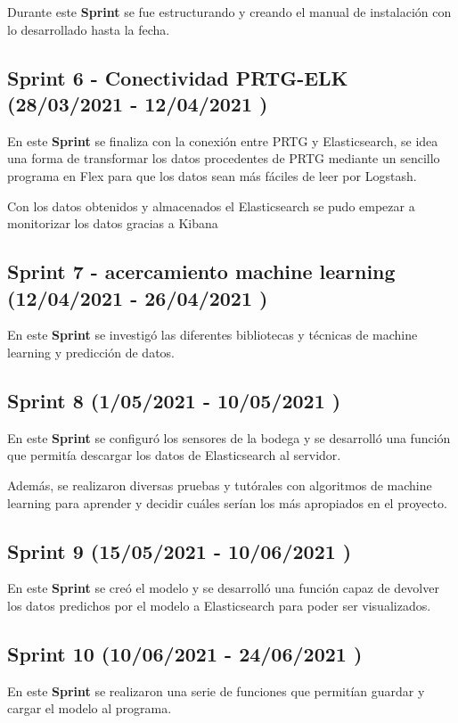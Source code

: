 Durante este \textbf{Sprint} se fue estructurando y creando el manual de instalación con lo desarrollado hasta la fecha.

\subsection{Sprint 6 - Conectividad PRTG-ELK (28/03/2021 - 12/04/2021 )}
En este \textbf{Sprint} se finaliza con la conexión entre PRTG y Elasticsearch, se idea una forma de transformar los datos procedentes de PRTG mediante un sencillo programa en Flex para que los datos sean más fáciles de leer por Logstash.

Con los datos obtenidos y almacenados el Elasticsearch se pudo empezar a monitorizar los datos gracias a Kibana

\subsection{Sprint 7 - acercamiento machine learning  (12/04/2021 - 26/04/2021 )}
En este \textbf{Sprint} se investigó las diferentes bibliotecas y técnicas  
de machine learning y predicción de datos.

\subsection{Sprint 8 (1/05/2021 - 10/05/2021 )}
En este \textbf{Sprint} se configuró los sensores de la bodega y se desarrolló una función que permitía descargar los datos de Elasticsearch al servidor.

Además, se realizaron diversas pruebas y tutórales con algoritmos de machine learning para aprender y decidir cuáles serían los más apropiados en el proyecto.

\subsection{Sprint 9   (15/05/2021 - 10/06/2021 )}

En este \textbf{Sprint} se creó el modelo y se desarrolló una función capaz de devolver los datos predichos por el modelo a Elasticsearch para poder ser visualizados.

\subsection{Sprint 10  (10/06/2021 - 24/06/2021 )}
En este \textbf{Sprint} se realizaron una serie de funciones que permitían guardar y cargar el modelo al programa.

